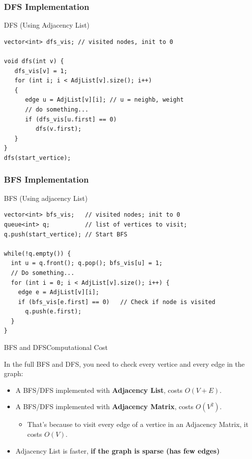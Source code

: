 \begin{frame}[fragile]
  \frametitle{DFS Implementation}
  \begin{exampleblock}{DFS (Using Adjacency List)}
\begin{verbatim}
vector<int> dfs_vis; // visited nodes, init to 0

void dfs(int v) {
   dfs_vis[v] = 1;
   for (int i; i < AdjList[v].size(); i++)
   {
      edge u = AdjList[v][i]; // u = neighb, weight
      // do something...
      if (dfs_vis[u.first] == 0)
         dfs(v.first);
   }
}
dfs(start_vertice);
\end{verbatim}
  \end{exampleblock}
\end{frame}

\begin{frame}[fragile]
  \frametitle{BFS Implementation}
  \begin{exampleblock}{BFS (Using adjacency List)}
\begin{verbatim}
vector<int> bfs_vis;   // visited nodes; init to 0
queue<int> q;          // list of vertices to visit;
q.push(start_vertice); // Start BFS

while(!q.empty()) {
  int u = q.front(); q.pop(); bfs_vis[u] = 1;
  // Do something...
  for (int i = 0; i < AdjList[v].size(); i++) {
    edge e = AdjList[v][i];
    if (bfs_vis[e.first] == 0)   // Check if node is visited
      q.push(e.first);
  }
}
\end{verbatim}
  \end{exampleblock}
\end{frame}

\begin{frame}{BFS and DFS}{Computational Cost}

  In the full BFS and DFS, you need to check every vertice and every edge in the graph:\bigskip

  \begin{itemize}
    \item A BFS/DFS implemented with {\bf Adjacency List}, costs $O(V+E)$.\bigskip

    \item A BFS/DFS implemented with {\bf Adjacency Matrix}, costs $O(V^2)$.
    \begin{itemize}
      \item That's because to visit every edge of a vertice in an Adjacency Matrix, it costs $O(V)$.
    \end{itemize}\bigskip

    \item Adjacency List is faster, {\bf if the graph is sparse (has few edges)}
  \end{itemize}
\end{frame}

